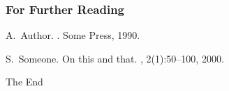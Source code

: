 \documentclass{beamer}
\begin{document}
\begin{frame}[allowframebreaks]
  \frametitle<presentation>{For Further Reading}
    
  \begin{thebibliography}{10}
    
  \beamertemplatebookbibitems

    A.~Author.
    .
    \newblock Some Press, 1990.
 
    
  \beamertemplatearticlebibitems

    S.~Someone.
    \newblock On this and that.
    , 2(1):50--100,
    2000.
  \end{thebibliography}
\end{frame}




\begin{frame}
\Huge{\centerline{The End}}
\end{frame}

\end{document}
